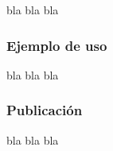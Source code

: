 bla bla bla

\subsubsection{Ejemplo de uso}

bla bla bla

\subsubsection{Publicación}

bla bla bla





 











